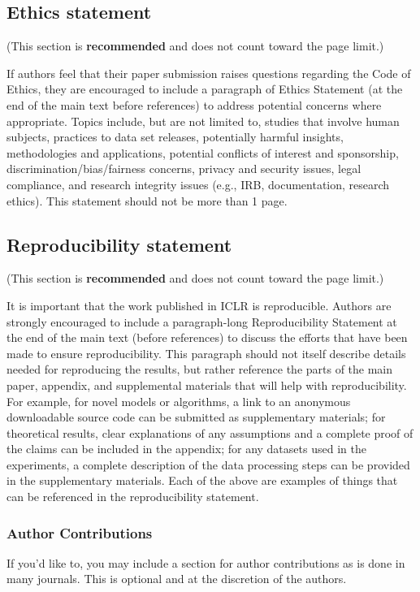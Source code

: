 \documentclass{article} %
\begin{document}
\subsection*{Ethics statement}

(This section is \textbf{recommended} and does not count toward the page limit.)

If authors feel that their paper submission raises questions regarding the Code
of Ethics, they are encouraged to include a paragraph of Ethics Statement (at
the end of the main text before references) to address potential concerns where
appropriate. Topics include, but are not limited to, studies that involve human
subjects, practices to data set releases, potentially harmful insights,
methodologies and applications, potential conflicts of interest and sponsorship,
discrimination/bias/fairness concerns, privacy and security issues, legal
compliance, and research integrity issues (e.g., IRB, documentation, research
ethics). This statement should not be more than 1 page.

\subsection*{Reproducibility statement}

(This section is \textbf{recommended} and does not count toward the page limit.)

It is important that the work published in ICLR is reproducible. Authors are
strongly encouraged to include a paragraph-long Reproducibility Statement at the
end of the main text (before references) to discuss the efforts that have been
made to ensure reproducibility. This paragraph should not itself describe
details needed for reproducing the results, but rather reference the parts of
the main paper, appendix, and supplemental materials that will help with
reproducibility. For example, for novel models or algorithms, a link to an
anonymous downloadable source code can be submitted as supplementary materials;
for theoretical results, clear explanations of any assumptions and a complete
proof of the claims can be included in the appendix; for any datasets used in
the experiments, a complete description of the data processing steps can be
provided in the supplementary materials. Each of the above are examples of
things that can be referenced in the reproducibility statement.

\subsubsection*{Author Contributions}
If you'd like to, you may include  a section for author contributions as is done
in many journals. This is optional and at the discretion of the authors.
\end{document}
